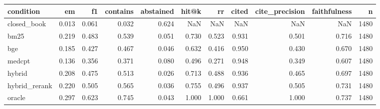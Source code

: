 \begin{tabular}{lrrrrrrrrrr}
\toprule
condition & em & f1 & contains & abstained & hit@k & rr & cited & cite_precision & faithfulness & n \\
\midrule
closed_book & 0.013 & 0.061 & 0.032 & 0.624 & NaN & NaN & NaN & NaN & NaN & 1480 \\
bm25 & 0.219 & 0.483 & 0.539 & 0.051 & 0.730 & 0.523 & 0.931 & 0.501 & 0.716 & 1480 \\
bge & 0.185 & 0.427 & 0.467 & 0.046 & 0.632 & 0.416 & 0.950 & 0.430 & 0.670 & 1480 \\
medcpt & 0.136 & 0.356 & 0.371 & 0.080 & 0.496 & 0.271 & 0.948 & 0.349 & 0.607 & 1480 \\
hybrid & 0.208 & 0.475 & 0.513 & 0.026 & 0.713 & 0.488 & 0.936 & 0.465 & 0.697 & 1480 \\
hybrid_rerank & 0.220 & 0.505 & 0.565 & 0.036 & 0.755 & 0.496 & 0.937 & 0.505 & 0.731 & 1480 \\
oracle & 0.297 & 0.623 & 0.745 & 0.043 & 1.000 & 1.000 & 0.661 & 1.000 & 0.737 & 1480 \\
\bottomrule
\end{tabular}
